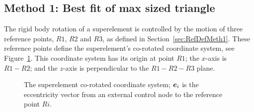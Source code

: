 {\subsection{Method 1: Best fit of max sized triangle}

The rigid body rotation of a superelement is controlled by the motion of three
reference points, $R1$, $R2$ and $R3$, as defined in
Section~\ref{sec:RefDefMeth1}.
These reference points define the superelement's co-rotated coordinate system,
see Figure~\ref{figSC:62}.
This coordinate system has its origin at point $R1$; the $x$-axis is $R1-R2$;
and the $z$-axis is perpendicular to the $R1-R2-R3$ plane.

\begin{figure}[t]
\caption{The superelement co-rotated coordinate system;
${\boldsymbol{e}}_i$ is the eccentricity vector from an external control node
to the reference point $Ri$.}
\label{figSC:62}
\end{figure}

}
